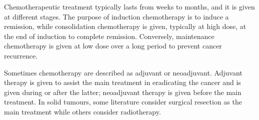 Chemotherapeutic treatment typically lasts from weeks to months, and it is given at different stages. The purpose of induction chemotherapy is to induce a remission, while consolidation chemotherapy is given, typically at high dose, at the end of induction to complete remission. Conversely, maintenance chemotherapy is given at low dose over a long period to prevent cancer recurrence.

Sometimes chemotherapy are described as adjuvant or neoadjuvant. Adjuvant therapy is given to assist the main treatment in eradicating the cancer and is given during or after the latter; neoadjuvant therapy is given before the main treatment. In solid tumours, some literature consider surgical resection as the main treatment while others consider radiotherapy.
